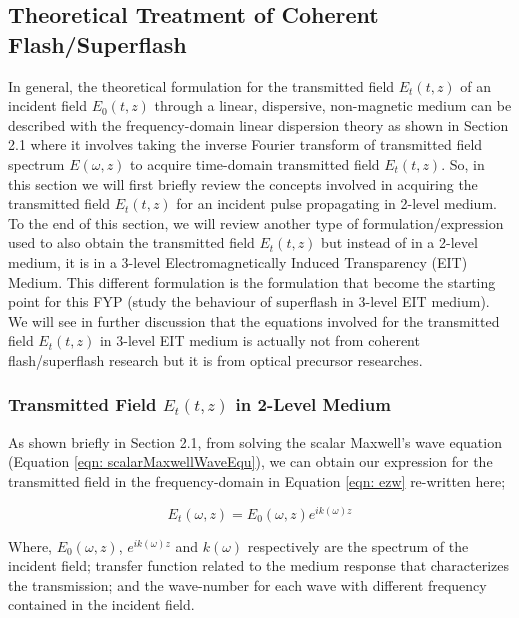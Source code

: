 \subsection{Theoretical Treatment of Coherent Flash/Superflash}
In general, the theoretical formulation for the transmitted field $E_{t}(t, z)$ of an incident field $E_{0}(t, z)$ through a linear, dispersive, non-magnetic medium can be described with the frequency-domain linear dispersion theory as shown in Section 2.1 where it involves taking the inverse Fourier transform of transmitted field spectrum $E(\omega, z)$ to acquire time-domain transmitted field $E_{t}(t, z)$. So, in this section we will first briefly review the concepts involved in acquiring the transmitted field $E_{t}(t, z)$ for an incident pulse propagating in 2-level medium. To the end of this section, we will review another type of formulation/expression used to also obtain the transmitted field $E_{t}(t, z)$ but instead of in a 2-level medium, it is in a 3-level Electromagnetically Induced Transparency (EIT) Medium. This different formulation is the formulation that become the starting point for this FYP (study the behaviour of superflash in 3-level EIT medium). We will see in further discussion that the equations involved for the transmitted field $E_{t}(t, z)$ in 3-level EIT medium is actually not from coherent flash/superflash research but it is from optical precursor researches.

\subsubsection{Transmitted Field $E_{t}(t, z)$ in 2-Level Medium}
As shown briefly in Section 2.1, from solving the scalar Maxwell's wave equation (Equation \ref{eqn: scalarMaxwellWaveEqu}), we can obtain our expression for the transmitted field in the frequency-domain in Equation \ref{eqn: ezw} re-written here;

\begin{equation}
    E_{t}(\omega, z) = E_{0}(\omega, z) e^{ik(\omega)z}
    \label{eqn: transmittedFieldSpectrum}
\end{equation}

Where, $E_{0}(\omega, z)$, $e^{ik(\omega)z}$ and $k(\omega)$ respectively are the spectrum of the incident field; transfer function related to the medium response that characterizes the transmission; and the wave-number for each wave with different frequency contained in the incident field.\\

